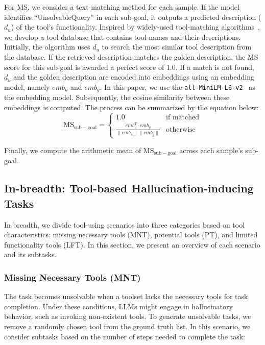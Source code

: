 \documentclass[11pt]{article}
\begin{document}
For MS, we consider a text-matching method for each sample. 
If the model identifies ``UnsolvableQuery'' in each sub-goal, it outputs a predicted description ($d_u$) of the tool's functionality.
Inspired by widely-used tool-matching algorithms~\cite{DBLP:journals/corr/abs-2310-03128@metatool,DBLP:conf/nips/ZhuangYWSZ23@toolqa}, we develop a tool database that contains tool names and their descriptions. 
Initially, the algorithm uses $d_u$ to search the most similar tool description from the database. 
If the retrieved description matches the golden description, the MS score for this sub-goal is awarded a perfect score of $1.0$.
If a match is not found, $d_u$ and the golden description are encoded into embeddings using an embedding model, namely $emb_u$ and $emb_g$. 
In this paper, we use the \texttt{all-MiniLM-L6-v2}~\cite{DBLP:conf/acl/WangBHDW21@minilmv2} as the embedding model.
Subsequently, the cosine similarity between these embeddings is computed.
The process can be summarized by the equation below:
\begin{equation}
\textstyle
\text{MS}_\mathrm{sub-goal} = 
\begin{cases} 
1.0 & \text{if matched} \\
\frac{emb_u^T \cdot emb_g}{\|emb_u\| \|emb_g\|} & \text{otherwise}
\end{cases}
\end{equation}

Finally, we compute the arithmetic mean of $\text{MS}_\mathrm{sub-goal}$ across each sample's sub-goal.

\subsection{In-breadth: Tool-based Hallucination-inducing Tasks}
\label{benchmark:hallu_scena}

In breadth, we divide tool-using scenarios into three categories based on tool characteristics: missing necessary tools (MNT), potential tools (PT), and limited functionality tools (LFT).
In this section, we present an overview of each scenario and its subtasks.

\subsubsection{Missing Necessary Tools (MNT)}
The task becomes unsolvable when a toolset lacks the necessary tools for task completion.
Under these conditions, LLMs might engage in hallucinatory behavior, such as invoking non-existent tools. 
To generate unsolvable tasks, we remove a randomly chosen tool from the ground truth list.
In this scenario, we consider subtasks based on the number of steps needed to complete the task:
\end{document}
